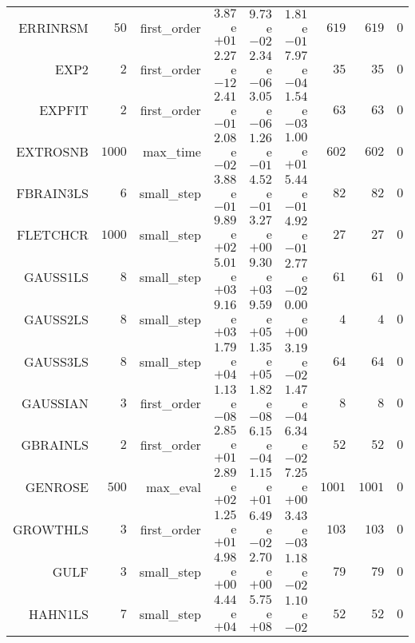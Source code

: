 \begin{longtable}{rrrrrrrrr}
ERRINRSM & \(    50\) & first\_order & \( 3.87\)e\(+01\) & \( 9.73\)e\(-02\) & \( 1.81\)e\(-01\) & \(   619\) & \(   619\) & \(     0\) \\
EXP2 & \(     2\) & first\_order & \( 2.27\)e\(-12\) & \( 2.34\)e\(-06\) & \( 7.97\)e\(-04\) & \(    35\) & \(    35\) & \(     0\) \\
EXPFIT & \(     2\) & first\_order & \( 2.41\)e\(-01\) & \( 3.05\)e\(-06\) & \( 1.54\)e\(-03\) & \(    63\) & \(    63\) & \(     0\) \\
EXTROSNB & \(  1000\) & max\_time & \( 2.08\)e\(-02\) & \( 1.26\)e\(-01\) & \( 1.00\)e\(+01\) & \(   602\) & \(   602\) & \(     0\) \\
FBRAIN3LS & \(     6\) & small\_step & \( 3.88\)e\(-01\) & \( 4.52\)e\(-01\) & \( 5.44\)e\(-01\) & \(    82\) & \(    82\) & \(     0\) \\
FLETCHCR & \(  1000\) & small\_step & \( 9.89\)e\(+02\) & \( 3.27\)e\(+00\) & \( 4.92\)e\(-01\) & \(    27\) & \(    27\) & \(     0\) \\
GAUSS1LS & \(     8\) & small\_step & \( 5.01\)e\(+03\) & \( 9.30\)e\(+03\) & \( 2.77\)e\(-02\) & \(    61\) & \(    61\) & \(     0\) \\
GAUSS2LS & \(     8\) & small\_step & \( 9.16\)e\(+03\) & \( 9.59\)e\(+05\) & \( 0.00\)e\(+00\) & \(     4\) & \(     4\) & \(     0\) \\
GAUSS3LS & \(     8\) & small\_step & \( 1.79\)e\(+04\) & \( 1.35\)e\(+05\) & \( 3.19\)e\(-02\) & \(    64\) & \(    64\) & \(     0\) \\
GAUSSIAN & \(     3\) & first\_order & \( 1.13\)e\(-08\) & \( 1.82\)e\(-08\) & \( 1.47\)e\(-04\) & \(     8\) & \(     8\) & \(     0\) \\
GBRAINLS & \(     2\) & first\_order & \( 2.85\)e\(+01\) & \( 6.15\)e\(-04\) & \( 6.34\)e\(-02\) & \(    52\) & \(    52\) & \(     0\) \\
GENROSE & \(   500\) & max\_eval & \( 2.89\)e\(+02\) & \( 1.15\)e\(+01\) & \( 7.25\)e\(+00\) & \(  1001\) & \(  1001\) & \(     0\) \\
GROWTHLS & \(     3\) & first\_order & \( 1.25\)e\(+01\) & \( 6.49\)e\(-02\) & \( 3.43\)e\(-03\) & \(   103\) & \(   103\) & \(     0\) \\
GULF & \(     3\) & small\_step & \( 4.98\)e\(+00\) & \( 2.70\)e\(+00\) & \( 1.18\)e\(-02\) & \(    79\) & \(    79\) & \(     0\) \\
HAHN1LS & \(     7\) & small\_step & \( 4.44\)e\(+04\) & \( 5.75\)e\(+08\) & \( 1.10\)e\(-02\) & \(    52\) & \(    52\) & \(     0\) \\

\end{longtable}
